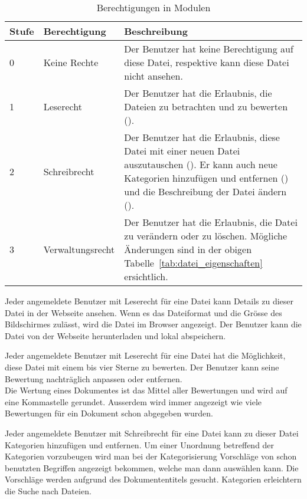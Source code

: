 \begin{table}[H]
\begin{tabularx}{\textwidth}{|l|l|X|} \hline
\textbf{Stufe} & \textbf{Berechtigung}     & \textbf{Beschreibung} \\ \hline
0     & Keine Rechte     & Der Benutzer hat keine Berechtigung auf diese Datei, respektive kann diese Datei nicht ansehen.\\ \hline
1     & Leserecht        & Der Benutzer hat die Erlaubnis, die Dateien zu betrachten und zu bewerten ({Datei bewerten}).\\ \hline
2     & Schreibrecht     & Der Benutzer hat die Erlaubnis, diese Datei mit einer neuen Datei auszutauschen ({Datei hochladen}). Er kann auch neue Kategorien hinzufügen und entfernen ({Datei kategorisieren}) und die Beschreibung der Datei ändern ({Datei bearbeiten}).\\ \hline
3     & Verwaltungsrecht & Der Benutzer hat die Erlaubnis, die Datei zu verändern oder zu löschen. Mögliche Änderungen sind in der obigen Tabelle~\ref{tab:datei_eigenschaften} ersichtlich.\\ \hline
\end{tabularx}
\caption{Berechtigungen in Modulen}
\label{tab:datei_rechte}
\end{table}

Jeder angemeldete Benutzer mit Leserecht für eine Datei kann Details zu dieser Datei in der Webseite ansehen. Wenn es das Dateiformat und die Grösse des Bildschirmes zulässt, wird die Datei im Browser angezeigt. Der Benutzer kann die Datei von der Webseite herunterladen und lokal abspeichern.

Jeder angemeldete Benutzer mit Leserecht für eine Datei hat die Möglichkeit, diese Datei mit einem bis vier Sterne  zu bewerten. Der Benutzer kann seine Bewertung nachträglich anpassen oder entfernen. \\
Die Wertung eines Dokumentes ist das Mittel aller Bewertungen und wird auf eine Kommastelle gerundet. Ausserdem wird immer angezeigt wie viele Bewertungen für ein Dokument schon abgegeben wurden.

Jeder angemeldete Benutzer mit Schreibrecht für eine Datei kann zu dieser Datei Kategorien hinzufügen und entfernen. Um einer Unordnung betreffend der Kategorien vorzubeugen wird man bei der Kategorisierung Vorschläge von schon benutzten Begriffen angezeigt bekommen, welche man dann auswählen kann. Die Vorschläge werden aufgrund des Dokumententitels gesucht. Kategorien erleichtern die Suche nach Dateien. 

